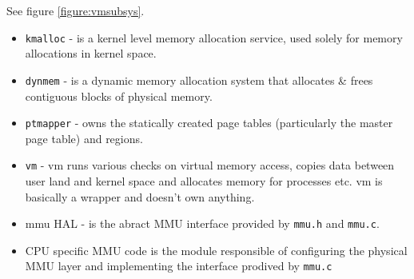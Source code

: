 See figure \ref{figure:vmsubsys}.

\begin{itemize}
  \item \verb+kmalloc+  - is a kernel level memory allocation service, used
                        solely for memory allocations in kernel space.
  \item \verb+dynmem+   - is a dynamic memory allocation system that allocates
                        \& frees contiguous blocks of physical memory.
  \item \verb+ptmapper+ - owns the statically created page tables (particularly
                        the master page table) and regions.
  \item \verb+vm+       - vm runs various checks on virtual memory access,
                        copies data between user land and kernel space and
                        allocates memory for processes etc. vm is basically
                        a wrapper and doesn't own anything.
  \item mmu HAL -       is the abract MMU interface provided by \verb+mmu.h+
                        and \verb+mmu.c+.
  \item CPU specific MMU code is the module responsible of configuring the
        physical MMU layer and implementing the interface prodived by
        \verb+mmu.c+
\end{itemize}

